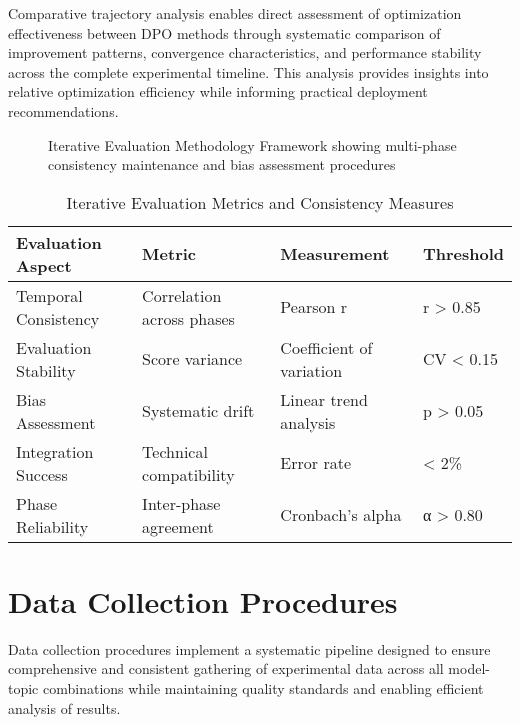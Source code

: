 Comparative trajectory analysis enables direct assessment of optimization effectiveness between DPO methods through systematic comparison of improvement patterns, convergence characteristics, and performance stability across the complete experimental timeline. This analysis provides insights into relative optimization efficiency while informing practical deployment recommendations.

\begin{figure}[htbp]
    \centering
    \caption{Iterative Evaluation Methodology Framework showing multi-phase consistency maintenance and bias assessment procedures}
    \label{fig:iterative-evaluation}
\end{figure}

\begin{table}[htbp]
    \centering
    \caption{Iterative Evaluation Metrics and Consistency Measures}
    \label{tab:iterative-evaluation-metrics}
    \begin{tabular}{|l|l|l|l|}
    \hline
    \textbf{Evaluation Aspect} & \textbf{Metric} & \textbf{Measurement} & \textbf{Threshold} \\
    \hline
    Temporal Consistency & Correlation across phases & Pearson r & r > 0.85 \\
    Evaluation Stability & Score variance & Coefficient of variation & CV < 0.15 \\
    Bias Assessment & Systematic drift & Linear trend analysis & p > 0.05 \\
    Integration Success & Technical compatibility & Error rate & < 2\% \\
    Phase Reliability & Inter-phase agreement & Cronbach's alpha & α > 0.80 \\
    \hline
    \end{tabular}
\end{table}

\section{Data Collection Procedures}
\label{sec:data-collection}

Data collection procedures implement a systematic pipeline designed to ensure comprehensive and consistent gathering of experimental data across all model-topic combinations while maintaining quality standards and enabling efficient analysis of results.

